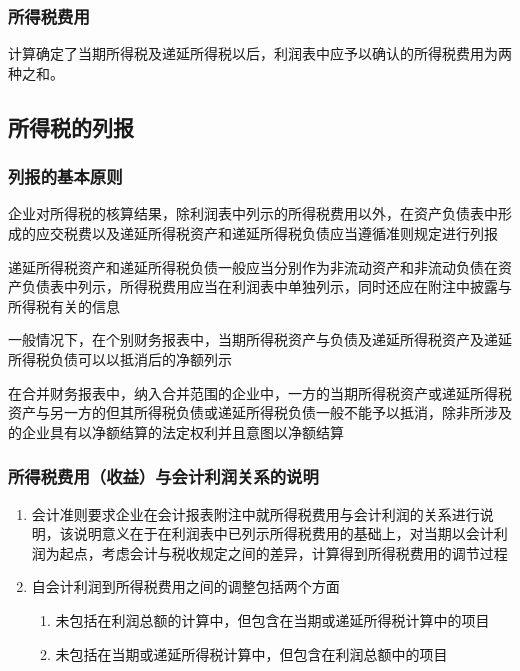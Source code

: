 \documentclass[UTF8,12pt]{ctexart}
\numberwithin{equation}{section} %
\numberwithin{figure}{section}
\numberwithin{table}{section}
\begin{document}
	\subsubsection{所得税费用}
	计算确定了当期所得税及递延所得税以后，利润表中应予以确认的所得税费用为两种之和。
	
	\subsection{所得税的列报}
	\subsubsection{列报的基本原则}
	企业对所得税的核算结果，除利润表中列示的所得税费用以外，在资产负债表中形成的应交税费以及递延所得税资产和递延所得税负债应当遵循准则规定进行列报
	
	递延所得税资产和递延所得税负债一般应当分别作为非流动资产和非流动负债在资产负债表中列示，所得税费用应当在利润表中单独列示，同时还应在附注中披露与所得税有关的信息
	
	一般情况下，在个别财务报表中，当期所得税资产与负债及递延所得税资产及递延所得税负债可以以抵消后的净额列示
	
	在合并财务报表中，纳入合并范围的企业中，一方的当期所得税资产或递延所得税资产与另一方的但其所得税负债或递延所得税负债一般不能予以抵消，除非所涉及的企业具有以净额结算的法定权利并且意图以净额结算
	
	\subsubsection{所得税费用（收益）与会计利润关系的说明}
	\begin{enumerate}
		\item 会计准则要求企业在会计报表附注中就所得税费用与会计利润的关系进行说明，该说明意义在于在利润表中已列示所得税费用的基础上，对当期以会计利润为起点，考虑会计与税收规定之间的差异，计算得到所得税费用的调节过程
		
		\item 自会计利润到所得税费用之间的调整包括两个方面
		\begin{enumerate}
			\item 未包括在利润总额的计算中，但包含在当期或递延所得税计算中的项目
			
			\item 未包括在当期或递延所得税计算中，但包含在利润总额中的项目
		\end{enumerate}
	\end{enumerate}
	
\end{document}
